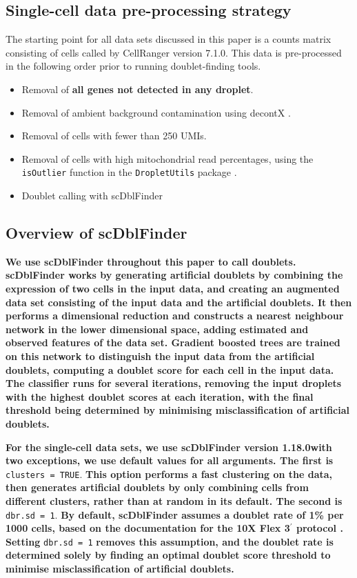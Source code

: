 \documentclass[unnumsec,webpdf,modern,large]{oup-authoring-template}
\begin{document}
	\subsection{Single-cell data pre-processing strategy}
	\label{subsec:preprocessing}
	
	The starting point for all data sets discussed in this paper is a counts matrix consisting of cells called by CellRanger version 7.1.0. This data is pre-processed in the following order prior to running doublet-finding tools. 
	\begin{itemize}
		\item Removal of \textbf{all genes not detected in any droplet}.
		\item Removal of ambient background contamination using decontX 
		\citep{Yang2020}.
		\item Removal of cells with fewer than 250 UMIs.
		\item Removal of cells with high mitochondrial read percentages, using the \texttt{isOutlier} function in the \texttt{DropletUtils} package
		\citep{Griffiths2018, Lun2019}.		
		\item Doublet calling with scDblFinder
		\citep{Germain2021}
	\end{itemize} 
	
	\subsection{Overview of scDblFinder}
	
	\textbf{We use scDblFinder
	\citep{Germain2021}
	throughout this paper to call doublets.
	scDblFinder works by generating artificial doublets by combining the expression of two cells in the input data, and creating an augmented data set consisting of the input data and the artificial doublets. 
	It then performs a dimensional reduction and constructs a nearest neighbour network in the lower dimensional space, adding estimated and observed features of the data set. 
	Gradient boosted trees are trained on this network to distinguish the input data from the artificial doublets, computing a doublet score for each cell in the input data.
	The classifier runs for several iterations, removing the input droplets with the highest doublet scores at each iteration, with the final threshold being determined by minimising misclassification of artificial doublets. }
	
	\textbf{For the single-cell data sets, we use scDblFinder version 1.18.0with two exceptions, we use default values for all arguments. 
	The first is} \texttt{clusters = TRUE}. 
	\textbf{This option performs a fast clustering on the data, then generates artificial doublets by only combining cells from different clusters, rather than at random in its default. 
	The second is} \texttt{dbr.sd = 1}.
	\textbf{By default, scDblFinder assumes a doublet rate of 1\% per 1000 cells, based on the documentation for the 10X Flex 3$^\prime$ protocol 
	\cite{10X_3_prime_protocol}.
	Setting} \texttt{dbr.sd = 1} \textbf{removes this assumption, and the doublet rate is determined solely by finding an optimal doublet score threshold to minimise misclassification of artificial doublets. }
	
\end{document}
